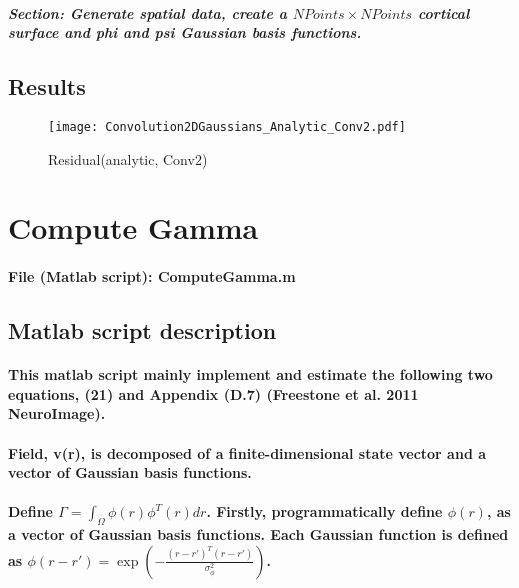 \documentclass[a4paper, 12pt, english]{article}
\begin{document}
\subparagraph{Section: Generate spatial data, create a $NPoints\times NPoints$ cortical surface and phi and psi Gaussian basis functions.\\}


\subsection{Results}
\begin{figure}[H]
\centering
\texttt{[image: Convolution2DGaussians\_Analytic\_Conv2.pdf]}
\caption{Residual(analytic, Conv2)}\label{Convolution2DGaussians_Analytic_Conv2.pdf}
\end{figure}



\newpage




\section{Compute Gamma}

\paragraph{File (Matlab script): ComputeGamma.m}

\subsection*{Matlab script description}

\paragraph{This matlab script mainly implement and estimate the following two
equations, (21) and Appendix (D.7) (Freestone et al. 2011 NeuroImage).}

\paragraph{Field, v(r), is decomposed of a finite-dimensional state vector and
a vector of Gaussian basis functions.}

\paragraph{Define $\Gamma=\int_{\Omega}\phi(r)\phi^{T}(r)dr$. Firstly, programmatically
define $\phi(r)$, as a vector of Gaussian basis functions. Each Gaussian
function is defined as $\phi(r-r')=\exp{(-\frac{(r-r')^{T}(r-r')}{\sigma_{\phi}^{2}})}$.}
\end{document}
